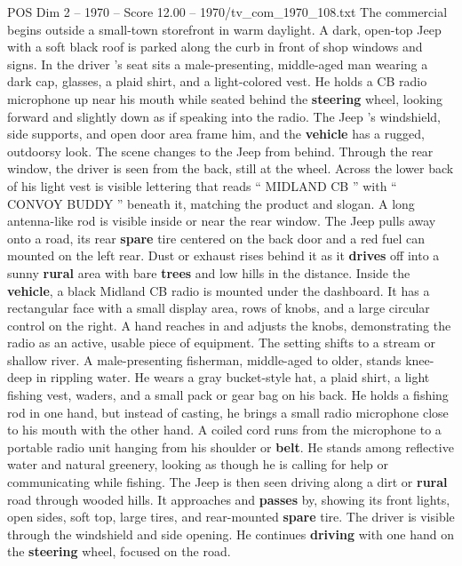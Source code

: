 \begin{textsample}{POS Dim 2 – 1970 – Score 12.00 – 1970/tv\_com\_1970\_108.txt}  \label{ex:f2_pos_080}
The commercial begins outside a small-town storefront in warm daylight.
A dark, open-top Jeep with a soft black roof is parked along the curb in front of shop windows and signs.
In the driver ’s seat sits a male-presenting, middle-aged man wearing a dark cap, glasses, a plaid shirt, and a light-colored vest.
He holds a CB radio microphone up near his mouth while seated behind the \textbf{steering} wheel, looking forward and slightly down as if speaking into the radio.
The Jeep ’s windshield, side supports, and open door area frame him, and the \textbf{vehicle} has a rugged, outdoorsy look.
The scene changes to the Jeep from behind.
Through the rear window, the driver is seen from the back, still at the wheel.
Across the lower back of his light vest is visible lettering that reads “ MIDLAND CB ” with “ CONVOY BUDDY ” beneath it, matching the product and slogan.
A long antenna-like rod is visible inside or near the rear window.
The Jeep pulls away onto a road, its rear \textbf{spare} tire centered on the back door and a red fuel can mounted on the left rear.
Dust or exhaust rises behind it as it \textbf{drives} off into a sunny \textbf{rural} area with bare \textbf{trees} and low hills in the distance.
Inside the \textbf{vehicle}, a black Midland CB radio is mounted under the dashboard.
It has a rectangular face with a small display area, rows of knobs, and a large circular control on the right.
A hand reaches in and adjusts the knobs, demonstrating the radio as an active, usable piece of equipment.
The setting shifts to a stream or shallow river.
A male-presenting fisherman, middle-aged to older, stands knee-deep in rippling water.
He wears a gray bucket-style hat, a plaid shirt, a light fishing vest, waders, and a small pack or gear bag on his back.
He holds a fishing rod in one hand, but instead of casting, he brings a small radio microphone close to his mouth with the other hand.
A coiled cord runs from the microphone to a portable radio unit hanging from his shoulder or \textbf{belt}.
He stands among reflective water and natural greenery, looking as though he is calling for help or communicating while fishing.
The Jeep is then seen driving along a dirt or \textbf{rural} road through wooded hills.
It approaches and \textbf{passes} by, showing its front lights, open sides, soft top, large tires, and rear-mounted \textbf{spare} tire.
The driver is visible through the windshield and side opening.
He continues \textbf{driving} with one hand on the \textbf{steering} wheel, focused on the road.

\end{textsample}
